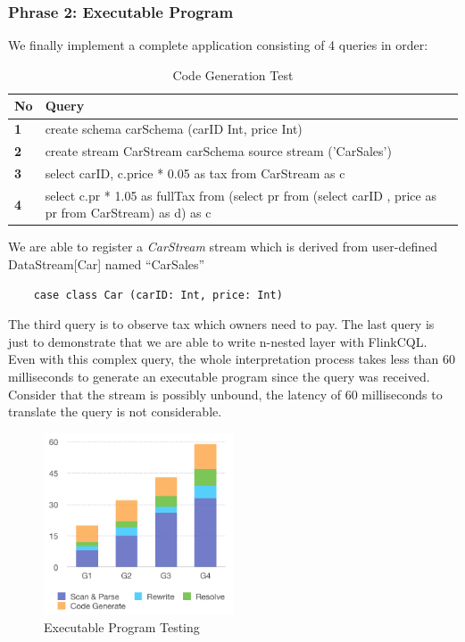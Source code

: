 \subsubsection{Phrase 2: Executable Program}



We finally implement a complete application consisting of 4 queries in order:

\begin{table}[h!]
\caption{Code Generation Test}
\centering
\label{table:GenerationTest}
\setlength\extrarowheight{5pt}
\begin{tabular}{||>{\centering\bfseries}m{0.5in}|>{\centering\arraybackslash}m{5in}||}
\hline
\textbf{No} & \textbf{Query} \\ \hline\hline
     		1 & 	       create schema carSchema (carID Int, price Int)\\ \hline
     		2 & create stream CarStream carSchema source stream ('CarSales')	       \\ \hline
     	3 & 		select carID, c.price * 0.05 as tax from CarStream as c       \\ \hline
     	4 &	select c.pr * 1.05 as fullTax from (select pr from (select carID , price  as pr from CarStream) as d) as c	       \\ \hline
	           				
 \end{tabular}
\end{table}

We are able to register a \textit{CarStream} stream which is derived from user-defined DataStream[Car] named ``CarSales''
\begin{lstlisting}
 	case class Car (carID: Int, price: Int)
\end{lstlisting}

The third query is to observe tax which owners need to pay. The last query is just to demonstrate that we are able to write n-nested layer with FlinkCQL. Even with this complex query, the whole interpretation process takes less than 60 milliseconds to generate an executable program since the query was received.  Consider that the stream is possibly unbound, the latency of 60 milliseconds to translate the query is not considerable. 

\begin{figure}[h!] 
\centering    
\includegraphics[width=0.5\textwidth]{ExecutableProgram}
\caption{Executable Program Testing}
\label{fig:ExecutableProgram}
\end{figure}